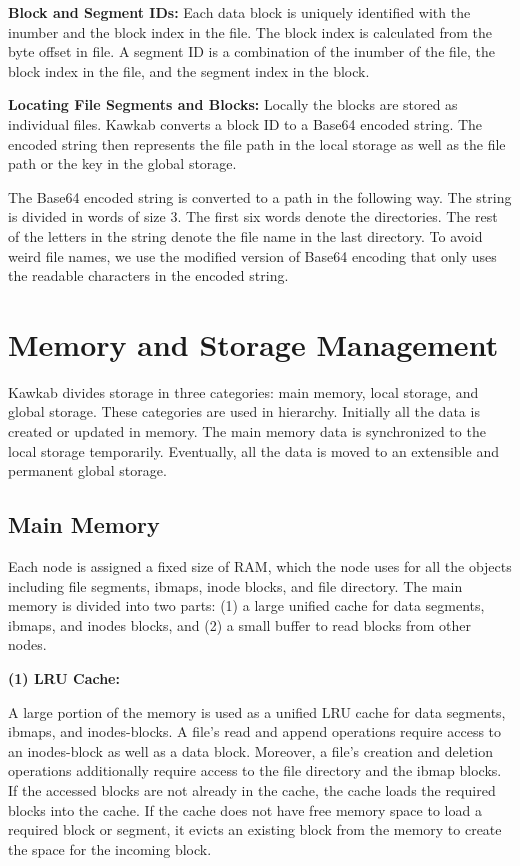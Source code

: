 \documentclass[]{article}
\newcommand{\subtopic}[1]{\vspace{1.5pt} \noindent \textbf{#1}}
\begin{document}

\subtopic{Block and Segment IDs:} Each data block is uniquely identified with
the inumber and the block index in the file.  The block index is calculated
from the byte offset in file.  A segment ID is a combination of the inumber of
the file, the block index in the file, and the segment index in the block.


\subtopic{Locating File Segments and Blocks:} Locally the blocks are stored as
individual files.  Kawkab converts a block ID to a Base64 encoded string. The
encoded string then represents the file path in the local storage as well as
the file path or the key in the global storage.

The Base64 encoded string is converted to a path in the following way.  The
string is divided in words of size 3. The first six words denote the
directories. The rest of the letters in the string denote the file name in the
last directory. To avoid weird file names, we use the modified version of
Base64 encoding that only uses the readable characters in the encoded string.


\section{Memory and Storage Management}

Kawkab divides storage in three categories: main memory, local storage, and global
storage. These categories are used in hierarchy. Initially all the data
is created or updated in memory. The main memory data is synchronized to the
local storage temporarily. Eventually, all the data is moved to an extensible
and permanent global storage.


\subsection{Main Memory}

Each node is assigned a fixed size of RAM, which the node uses 
for all the objects including file segments, ibmaps, inode blocks, and
file directory. The main memory is divided into two parts: (1) a large
unified cache for data segments, ibmaps, and inodes blocks, and (2) a small
buffer to read blocks from other nodes.


\subtopic{(1) LRU Cache:} 

A large portion of the memory is used as a unified LRU cache for data segments,
ibmaps, and inodes-blocks.  A file's read and append operations require access
to an inodes-block as well as a data block. Moreover, a file's creation and
deletion operations additionally require access to the file directory and the
ibmap blocks. If the accessed blocks are not already in the cache, the cache
loads the required blocks into the cache.  If the cache does not have free
memory space to load a required block or segment, it evicts an existing block
from the memory to create the space for the incoming block. 
\end{document}
